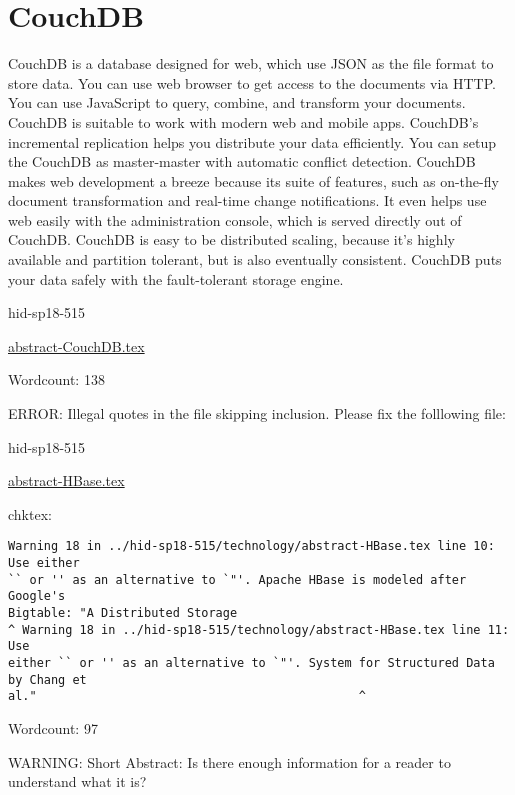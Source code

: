 \section{CouchDB}

CouchDB\cite{hid-sp18-515-www-couchdb} is a database designed for web, 
which use JSON as the file format to store data. You can use web 
browser to get access to the documents via HTTP. You can use JavaScript 
to query, combine, and transform your documents. CouchDB is suitable 
to work with modern web and mobile apps. CouchDB’s incremental replication 
helps you distribute your data efficiently. You can setup the CouchDB 
as master-master with automatic conflict detection. CouchDB makes 
web development a breeze because its suite of features, such as 
on-the-fly document transformation and real-time change notifications. 
It even helps use web easily with the administration console, which 
is served directly out of CouchDB. CouchDB is easy to be distributed 
scaling, because it's highly available and partition tolerant, but 
is also eventually consistent. CouchDB puts your data safely with 
the fault-tolerant storage engine.



\begin{IU}

hid-sp18-515

\href{https://github.com/cloudmesh-community/hid-sp18-515/blob/master//technology/abstract-CouchDB.tex}{abstract-CouchDB.tex}

 

Wordcount: 138

\end{IU}

ERROR: Illegal quotes in the file skipping inclusion. Please fix the folllowing file:

\begin{IU}

hid-sp18-515

\href{https://github.com/cloudmesh-community/hid-sp18-515/blob/master//technology/abstract-HBase.tex}{abstract-HBase.tex}

 
chktex:
\begin{tiny}
\begin{verbatim}
Warning 18 in ../hid-sp18-515/technology/abstract-HBase.tex line 10: Use either
`` or '' as an alternative to `"'. Apache HBase is modeled after Google's
Bigtable: "A Distributed Storage
^ Warning 18 in ../hid-sp18-515/technology/abstract-HBase.tex line 11: Use
either `` or '' as an alternative to `"'. System for Structured Data by Chang et
al."                                             ^
\end{verbatim}
\end{tiny}

Wordcount: 97

WARNING: Short Abstract: Is there enough information for a reader to understand what it is?

\end{IU}


